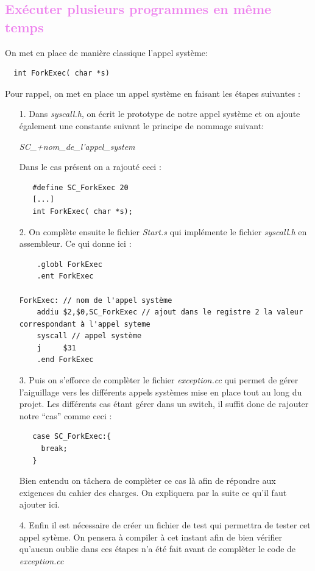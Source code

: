 \documentclass[a4paper,10pt]{report}
\begin{document}
  \textcolor{Violet}{\section{Exécuter plusieurs programmes en même temps}}
  On met en place de manière classique l'appel système: 
  \begin{lstlisting}
  int ForkExec( char *s)
  \end{lstlisting}
  Pour rappel, on met en place un appel système en faisant les étapes suivantes :
  \begin{itemize}
   \item[1.] Dans \emph{syscall.h}, on écrit le prototype de notre appel système et on ajoute également une constante suivant le principe de nommage suivant:
   \begin{center}
   \emph{SC\_+nom\_de\_l'appel\_system}
   \end{center}
  Dans le cas présent on a rajouté ceci : 
  \begin{lstlisting}
   #define SC_ForkExec 20
   [...]
   int ForkExec( char *s);
  \end{lstlisting}
  \item[2.] On complète ensuite le fichier \emph{Start.s} qui implémente le fichier \emph{syscall.h} en assembleur. Ce qui donne ici :
  \begin{lstlisting}
   	.globl ForkExec
	.ent ForkExec

ForkExec: // nom de l'appel système
	addiu $2,$0,SC_ForkExec // ajout dans le registre 2 la valeur correspondant à l'appel syteme
	syscall // appel système
	j     $31
	.end ForkExec
  \end{lstlisting}
  \item[3.] Puis on s'efforce de complèter le fichier \emph{exception.cc} qui permet de gérer l'aiguillage vers les différents appels systèmes mise en place 
  tout au long du projet. Les différents cas étant gérer dans un switch, il suffit donc de rajouter notre ``cas'' comme ceci :
  \begin{lstlisting}
   case SC_ForkExec:{
     break;
   }
  \end{lstlisting}
  Bien entendu on tâchera de complèter ce cas là afin de répondre aux exigences du cahier des charges. On expliquera par la suite ce qu'il faut ajouter ici.
  
  \item[4.] Enfin il est nécessaire de créer un fichier de test qui permettra de tester cet appel sytème. On pensera à compiler à cet instant afin de bien 
  vérifier qu'aucun oublie dans ces étapes n'a été fait avant de complèter le code de \emph{exception.cc}
  \end{itemize}  
\end{document}
